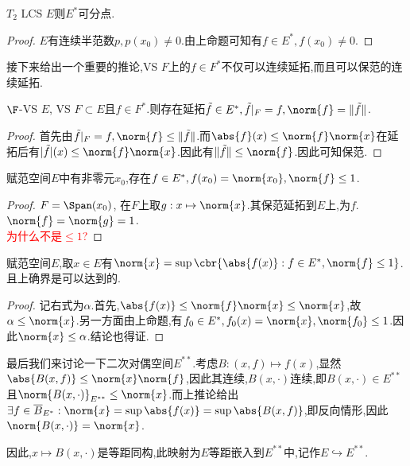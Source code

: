 \documentclass{article}
\begin{document}
\begin{proposition}\label{HBProp2}
    $T_2$ LCS $E$则$E^*$可分点.
\end{proposition}
\begin{proof}
    $E$有连续半范数$p, p(x_0)\neq 0$.由上命题可知有$f\in E^*, f(x_0)\neq 0$.
\end{proof}

接下来给出一个重要的推论,VS $F$上的$f\in F^*$不仅可以连续延拓,而且可以保范的连续延拓.
\begin{proposition}\label{HBProp3}
    $\F$-VS $E$, VS $F\subset E$且$f\in F^*$.则存在延拓$\tilde{f}\in E^*, \tilde{f}|_F=f,\norm{f}=\|\tilde{f}\|$.
\end{proposition}
\begin{proof}
    首先由$\tilde{f}|_F=f, \norm{f}\leq \|\tilde{f}\|$.而$\abs{f}(x)\leq \norm{f}\norm{x}$在延拓后有$|\tilde{f}|(x)\leq \norm{f}\norm{x}$.因此有$\|\tilde{f}\|\leq \norm{f}$.因此可知保范.
\end{proof}

\begin{proposition}
    赋范空间$E$中有非零元$x_0$,存在$f\in E^*, f(x_0)=\norm{x_0}, \norm{f}\leq 1$.
\end{proposition}
\begin{proof}
    $F=\Span(x_0)$, 在$F$上取$g:x\mapsto \norm{x}$.其保范延拓到$E$上,为$f$.$\norm{f}=\norm{g}=1$.\\
    \textcolor{red}{为什么不是$\leq 1$?}
\end{proof}

\begin{proposition}
    赋范空间$E$,取$x\in E$有$\norm{x}=\sup\cbr{\abs{f(x)}:f\in E^*, \norm{f}\leq 1}$.且上确界是可以达到的. 
\end{proposition}
\begin{proof}
    记右式为$\alpha$.首先,$\abs{f(x)}\leq \norm{f}\norm{x}\leq\norm{x}$,故$\alpha\leq \norm{x}$.另一方面由上命题,有$f_0\in E^*, f_0(x)=\norm{x}, \norm{f_0}\leq 1$.因此$\norm{x}\leq \alpha$.结论也得证.
\end{proof}

最后我们来讨论一下二次对偶空间$E^{**}$.考虑$B:(x,f)\mapsto f(x)$,显然$\abs{B(x,f)}\leq \norm{x}\norm{f}$,因此其连续,$B(x,\cdot)$连续,即$B(x,\cdot)\in E^{**}$且$\norm{B(x,\cdot)}_{E^{**}}\leq \norm{x}$.而上推论给出$\exists f\in \overline{B}_{E^*}:\norm{x}=\sup \abs{f(x)}=\sup \abs{B(x,f)}$,即反向情形,因此$\norm{B(x,\cdot)}=\norm{x}$.

因此,$x\mapsto B(x,\cdot)$是等距同构,此映射为$E$等距嵌入到$E^{**}$中,记作$E\hookrightarrow E^{**}$.
\end{document}
